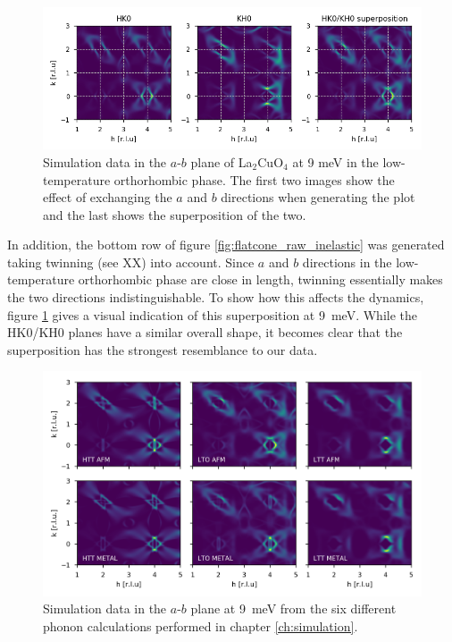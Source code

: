 \begin{figure}
    \centering
    \includegraphics[width=\textwidth]{fig/lowen/simulation_colorplot_twin_comparison.png}
    \caption[Simulation comparison hkl khl]{Simulation data in the $a$-$b$ plane of La$_2$CuO$_4$ at 9 meV in the low-temperature orthorhombic phase. The first two images show the effect of exchanging the $a$ and $b$ directions when generating the plot and the last shows the superposition of the two.}
    \label{fig:lto_hk0_kh0_comparison}
\end{figure}

In addition, the bottom row of figure \ref{fig:flatcone_raw_inelastic} was generated taking twinning (see XX) into account. Since $a$ and $b$ directions in the low-temperature orthorhombic phase are close in length, twinning essentially makes the two directions indistinguishable. To show how this affects the dynamics, figure \ref{fig:lto_hk0_kh0_comparison} gives a visual indication of this superposition at \SI{9}{\milli\eV}. While the HK0/KH0 planes have a similar overall shape, it becomes clear that the superposition has the strongest resemblance to our data.

\begin{figure}
    \centering
    \includegraphics[width=\textwidth]{fig/lowen/twinning_plots_all.png}
    \caption[All qxqy plots at 9 meV including twinning for the LTO case]{Simulation data in the $a$-$b$ plane at \SI{9}{\milli\eV} from the six different phonon calculations performed in chapter \ref{ch:simulation}.}
    \label{fig:simulation_sqw_xy_plots_all}
\end{figure}


